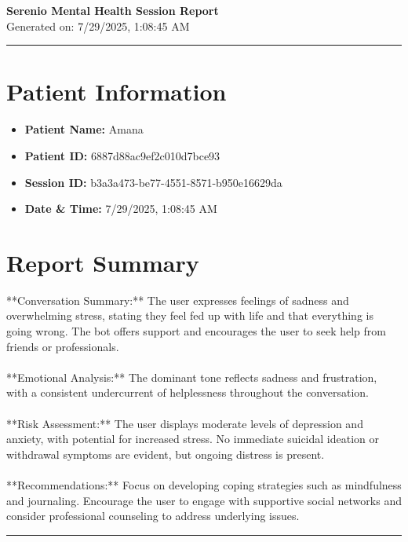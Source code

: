 \documentclass[a4paper,12pt]{article}
\begin{document}
\begin{center}
{\Huge \textbf{Serenio Mental Health Session Report}} \\
\vspace{0.5cm}
{\large Generated on: 7/29/2025, 1:08:45 AM} \\
\vspace{1cm}
\hrule
\end{center}

\section*{Patient Information}
\begin{itemize}
  \item \textbf{Patient Name:} Amana
  \item \textbf{Patient ID:} 6887d88ac9ef2c010d7bce93
  \item \textbf{Session ID:} b3a3a473-be77-4551-8571-b950e16629da
  \item \textbf{Date & Time:} 7/29/2025, 1:08:45 AM
\end{itemize}

\section*{Report Summary}
**Conversation Summary:** The user expresses feelings of sadness and overwhelming stress, stating they feel fed up with life and that everything is going wrong. The bot offers support and encourages the user to seek help from friends or professionals. \\  \\ **Emotional Analysis:** The dominant tone reflects sadness and frustration, with a consistent undercurrent of helplessness throughout the conversation. \\  \\ **Risk Assessment:** The user displays moderate levels of depression and anxiety, with potential for increased stress. No immediate suicidal ideation or withdrawal symptoms are evident, but ongoing distress is present. \\  \\ **Recommendations:** Focus on developing coping strategies such as mindfulness and journaling. Encourage the user to engage with supportive social networks and consider professional counseling to address underlying issues.

\vspace{1cm}
\hrule
\end{document}
